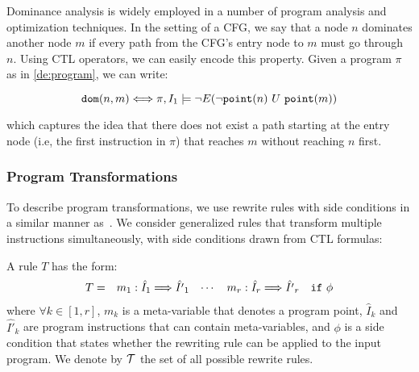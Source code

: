 

\begin{example}
Dominance analysis is widely employed in a number of program analysis and optimization techniques. In the setting of a CFG, we say that a node $n$ dominates another node $m$ if every path from the CFG's entry node to $m$ must go through $n$. Using CTL operators, we can easily encode this property. Given a program $\pi$ as in \mydefinition\ref{de:program}, we can write:

\begin{equation*}
 \text{${\tt dom}$}(n,m) \Longleftrightarrow \pi,I_1 \models \neg E(\neg\text{${\tt point}$}(n)~U~\text{${\tt point}$}(m))
\end{equation*}

\noindent which captures the idea that there does not exist a path starting at the entry node (i.e, the first instruction in $\pi$) that reaches $m$ without reaching $n$ first.
\end{example}

\subsubsection*{Program Transformations}

To describe program transformations, we use rewrite rules with side conditions in a similar manner as~\cite{Lacey04,Kundu09}. We consider generalized rules that transform multiple instructions simultaneously, with side conditions drawn from CTL formulas:

\begin{definition}
\label{de:rewrite-rule}
A rule $T$ has the form:
\vspace{-1mm}
\begin{equation*}
\begin{array}{lllll}
T = & m_1: \hat{I}_1 \Longrightarrow \hat{I'}_1 %
& \cdots
& m_r: \hat{I}_r \Longrightarrow \hat{I'}_r
& {\tt if} ~ \phi
\end{array}
\vspace{-1mm}
\end{equation*}
\noindent where $\forall k\in[1,r]$, $m_k$ is a meta-variable that denotes a program point, $\hat{I}_k$ and $\hat{I'}_k$ are program instructions that can contain meta-variables, and $\phi$ is a side condition that states whether the rewriting rule can be applied to the input program. We denote by $\mathcal{T}$ the set of all possible rewrite rules.
\end{definition}

